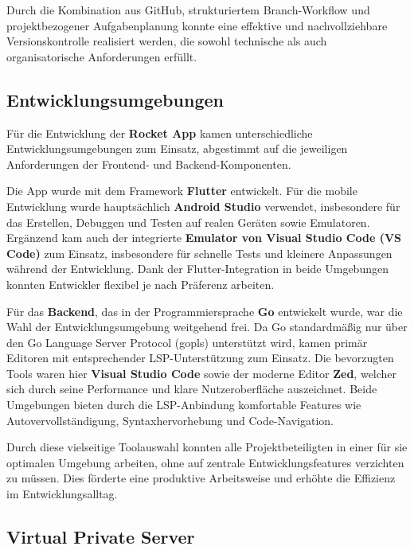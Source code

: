\documentclass[11pt,a4paper]{article}
\begin{document}
Durch die Kombination aus GitHub, strukturiertem Branch-Workflow und projektbezogener Aufgabenplanung konnte eine effektive und nachvollziehbare Versionskontrolle realisiert werden, die sowohl technische als auch organisatorische Anforderungen erfüllt.

\subsection{Entwicklungsumgebungen}

Für die Entwicklung der \textbf{Rocket App} kamen unterschiedliche Entwicklungsumgebungen zum Einsatz, abgestimmt auf die jeweiligen Anforderungen der Frontend- und Backend-Komponenten.

Die App wurde mit dem Framework \textbf{Flutter}\cite{flutter} entwickelt. Für die mobile Entwicklung wurde hauptsächlich \textbf{Android Studio}\cite{androidstudio} verwendet, insbesondere für das Erstellen, Debuggen und Testen auf realen Geräten sowie Emulatoren. Ergänzend kam auch der integrierte \textbf{Emulator von Visual Studio Code (VS Code)}\cite{VSCode} zum Einsatz, insbesondere für schnelle Tests und kleinere Anpassungen während der Entwicklung. Dank der Flutter-Integration in beide Umgebungen konnten Entwickler flexibel je nach Präferenz arbeiten.

Für das \textbf{Backend}, das in der Programmiersprache \textbf{Go}\cite{golang} entwickelt wurde, war die Wahl der Entwicklungsumgebung weitgehend frei. Da Go standardmäßig nur über den Go Language Server Protocol (gopls)\cite{gopls} unterstützt wird, kamen primär Editoren mit entsprechender LSP-Unterstützung zum Einsatz. Die bevorzugten Tools waren hier \textbf{Visual Studio Code}\cite{VSCode} sowie der moderne Editor \textbf{Zed}\cite{zed}, welcher sich durch seine Performance und klare Nutzeroberfläche auszeichnet. Beide Umgebungen bieten durch die LSP-Anbindung komfortable Features wie Autovervollständigung, Syntaxhervorhebung und Code-Navigation.

Durch diese vielseitige Toolauswahl konnten alle Projektbeteiligten in einer für sie optimalen Umgebung arbeiten, ohne auf zentrale Entwicklungsfeatures verzichten zu müssen. Dies förderte eine produktive Arbeitsweise und erhöhte die Effizienz im Entwicklungsalltag.

\subsection{Virtual Private Server}
\end{document}
